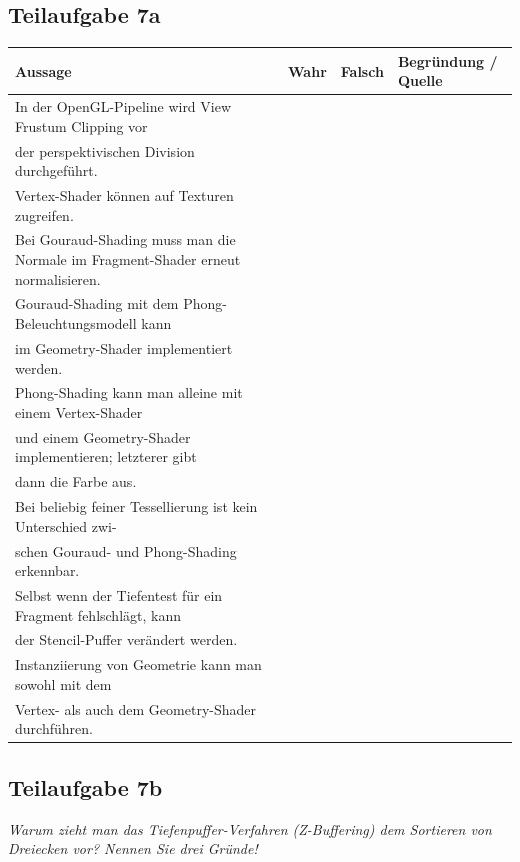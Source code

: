 \documentclass[a4paper]{scrartcl}
\begin{document}
\subsection*{Teilaufgabe 7a}
\begin{tabular}{p{8cm}llp{4cm}}\toprule
    Aussage & Wahr & Falsch & Begründung / Quelle \\\midrule
    In der OpenGL-Pipeline wird View Frustum Clipping vor\\der perspektivischen Division durchgeführt.                                    & ~    & ~      & ~                   \\
    Vertex-Shader können auf Texturen zugreifen.                                                                                          & ~    & ~      & ~                   \\
    Bei Gouraud-Shading muss man die Normale im Fragment-Shader erneut normalisieren.                                                     & ~    & ~      & ~                   \\
    Gouraud-Shading mit dem Phong-Beleuchtungsmodell kann\\im Geometry-Shader implementiert werden.                                       & ~    & ~      & ~                   \\
    Phong-Shading kann man alleine mit einem Vertex-Shader\\und einem Geometry-Shader implementieren; letzterer gibt\\dann die Farbe aus. & ~    & ~      & ~                   \\
    Bei beliebig feiner Tessellierung ist kein Unterschied zwi-\\schen Gouraud- und Phong-Shading erkennbar.                              & ~    & ~      & ~                   \\
    Selbst wenn der Tiefentest für ein Fragment fehlschlägt, kann\\der Stencil-Puffer verändert werden.                                   & ~    & ~      & ~                   \\
    Instanziierung von Geometrie kann man sowohl mit dem\\Vertex- als auch dem Geometry-Shader durchführen.                               & ~    & ~      & ~                   \\\bottomrule
\end{tabular}

\subsection*{Teilaufgabe 7b}
\textit{Warum zieht man das Tiefenpuffer-Verfahren (Z-Buffering) dem Sortieren von Dreiecken vor? Nennen Sie drei Gründe!}
\end{document}
